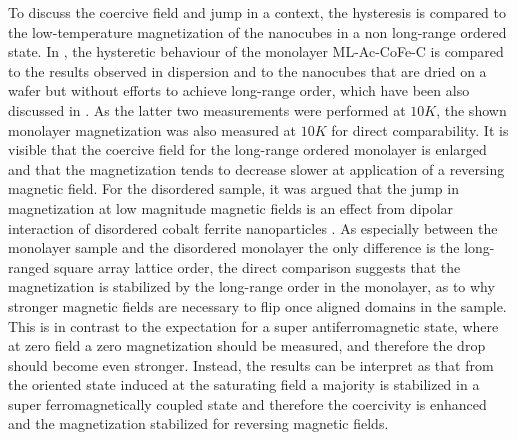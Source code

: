 \documentclass[\main/dresen_thesis.tex]{subfiles}
\begin{document}
  To discuss the coercive field and jump in a context, the hysteresis is compared to the low-temperature magnetization of the nanocubes in a non long-range ordered state.
  In , the hysteretic behaviour of the monolayer ML-Ac-CoFe-C is compared to the results observed in dispersion and to the nanocubes that are dried on a wafer but without efforts to achieve long-range order, which have been also discussed in .
  As the latter two measurements were performed at $10 \unit{K}$, the shown monolayer magnetization was also measured at $10 \unit{K}$ for direct comparability.
  It is visible that the coercive field for the long-range ordered monolayer is enlarged and that the magnetization tends to decrease slower at application of a reversing magnetic field.
  For the disordered sample, it was argued that the jump in magnetization at low magnitude magnetic fields is an effect from dipolar interaction of disordered cobalt ferrite nanoparticles \cite{Alves_2017_Waspw}.
  As especially between the monolayer sample and the disordered monolayer the only difference is the long-ranged square array lattice order, the direct comparison suggests that the magnetization is stabilized by the long-range order in the monolayer, as to why stronger magnetic fields are necessary to flip once aligned domains in the sample.
  This is in contrast to the expectation for a super antiferromagnetic state, where at zero field a zero magnetization should be measured, and therefore the drop should become even stronger.
  Instead, the results can be interpret as that from the oriented state induced at the saturating field a majority is stabilized in a super ferromagnetically coupled state and therefore the coercivity is enhanced and the magnetization stabilized for reversing magnetic fields.
\end{document}
